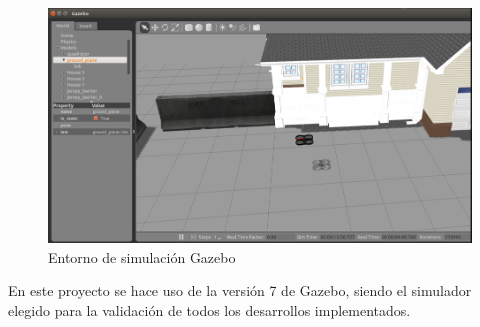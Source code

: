 \begin{figure}[H]
    \centering
    \includegraphics[scale=0.50]{img/gazebo.PNG}
  	\caption{Entorno de simulación Gazebo}
  	\label{fig:gazebo}
\end{figure}

En este proyecto se hace uso de la versión 7 de Gazebo, siendo el simulador elegido para la validación de todos los desarrollos implementados.